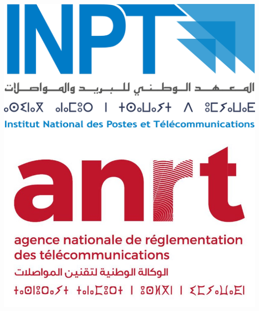
\thispagestyle{empty}
\includegraphics[scale=0.08]{Logos/Logo_INPT.png} 
         \hspace{11cm}  
\includegraphics[scale=0.1]{Logos/Logo_ANRT.jpg}
        
